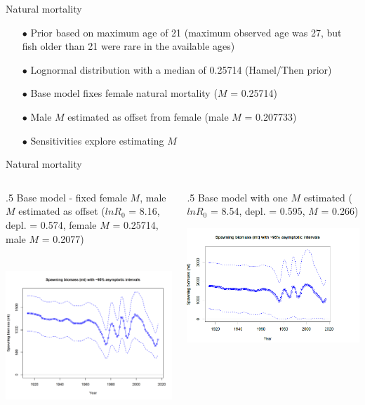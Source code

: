 \documentclass[ignorenonframetext,]{beamer}
\def\begincols{\begin{columns}}
\def\begincol{\begin{column}}
\def\endcol{\end{column}}
\def\endcols{\end{columns}}
\begin{document}
\begin{frame}{Natural mortality}

\begin{itemize}
\item[$\bullet$] Prior based on maximum age of 21 (maximum observed age was 27, but fish older than 21 were rare in the available ages)
\item[$\bullet$] Lognormal distribution with a median of 0.25714 (Hamel/Then prior)
\item[$\bullet$] Base model fixes female natural mortality ($M$ = 0.25714)
\item[$\bullet$] Male $M$ estimated as offset from female (male $M$ = 0.207733)
\item[$\bullet$] Sensitivities explore estimating $M$
\end{itemize}

\end{frame}

\begin{frame}{Natural mortality}

\begincols
 \begincol{.5\textwidth} Base model - fixed female \(M\), male \(M\)
estimated as offset (\(lnR_0\) = 8.16, depl. = 0.574, female \(M\) =
0.25714, male \(M\) = 0.2077)

\includegraphics[height=6cm]{r4ss/plots_mod1/ts7_Spawning_biomass_(mt)_with_95_asymptotic_intervals_intervals.png}
\endcol
 \begincol{.5\textwidth} Base model with one \(M\) estimated (\(lnR_0\)
= 8.54, depl. = 0.595, \(M\) = 0.266)

\includegraphics{Figures/SpawnB_BaseOneM.png}\\
\endcol
\endcols

\end{frame}
\end{document}
